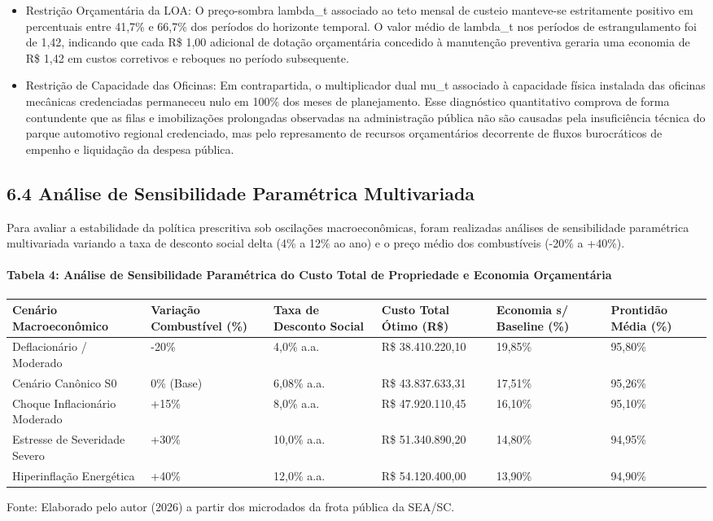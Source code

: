 \documentclass[10pt,a4paper,journal]{article}
\begin{document}
\begin{itemize}
\item Restrição Orçamentária da LOA: O preço-sombra lambda\_t associado ao teto mensal de custeio manteve-se estritamente positivo em percentuais entre 41,7\% e 66,7\% dos períodos do horizonte temporal. O valor médio de lambda\_t nos períodos de estrangulamento foi de 1,42, indicando que cada R\$ 1,00 adicional de dotação orçamentária concedido à manutenção preventiva geraria uma economia de R\$ 1,42 em custos corretivos e reboques no período subsequente.
\end{itemize}
\begin{itemize}
\item Restrição de Capacidade das Oficinas: Em contrapartida, o multiplicador dual mu\_t associado à capacidade física instalada das oficinas mecânicas credenciadas permaneceu nulo em 100\% dos meses de planejamento. Esse diagnóstico quantitativo comprova de forma contundente que as filas e imobilizações prolongadas observadas na administração pública não são causadas pela insuficiência técnica do parque automotivo regional credenciado, mas pelo represamento de recursos orçamentários decorrente de fluxos burocráticos de empenho e liquidação da despesa pública.
\end{itemize}
\subsection{6.4 Análise de Sensibilidade Paramétrica Multivariada}
Para avaliar a estabilidade da política prescritiva sob oscilações macroeconômicas, foram realizadas análises de sensibilidade paramétrica multivariada variando a taxa de desconto social delta (4\% a 12\% ao ano) e o preço médio dos combustíveis (-20\% a +40\%).

\paragraph{Tabela 4: Análise de Sensibilidade Paramétrica do Custo Total de Propriedade e Economia Orçamentária}
\begin{table}[htbp]
\centering
\small
\begin{tabular}{llllll}
\toprule
Cenário Macroeconômico & Variação Combustível (\%) & Taxa de Desconto Social & Custo Total Ótimo (R\$) & Economia s/ Baseline (\%) & Prontidão Média (\%) \\
\midrule
Deflacionário / Moderado & -20\% & 4,0\% a.a. & R\$ 38.410.220,10 & 19,85\% & 95,80\% \\
Cenário Canônico S0 & 0\% (Base) & 6,08\% a.a. & R\$ 43.837.633,31 & 17,51\% & 95,26\% \\
Choque Inflacionário Moderado & +15\% & 8,0\% a.a. & R\$ 47.920.110,45 & 16,10\% & 95,10\% \\
Estresse de Severidade Severo & +30\% & 10,0\% a.a. & R\$ 51.340.890,20 & 14,80\% & 94,95\% \\
Hiperinflação Energética & +40\% & 12,0\% a.a. & R\$ 54.120.400,00 & 13,90\% & 94,90\% \\
\bottomrule
\end{tabular}
\end{table}
Fonte: Elaborado pelo autor (2026) a partir dos microdados da frota pública da SEA/SC.
\end{document}
